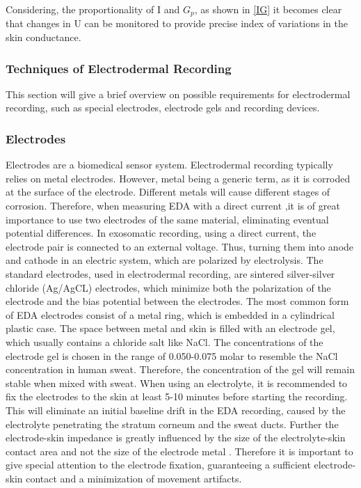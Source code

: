 Considering, the proportionality of I and $G_{p}$, as shown in \ref{IG} it becomes clear that changes in U can be monitored to provide precise index of variations in the skin conductance.\\

\subsubsection{Techniques of Electrodermal Recording}

This section will give a brief overview on possible requirements for electrodermal recording, such as special electrodes, electrode gels and recording devices.

\subsubsection*{Electrodes}
Electrodes are a biomedical sensor system. Electrodermal recording typically relies on metal electrodes. However, metal being a generic term, as it is corroded at the surface of the electrode. Different metals will cause different stages of corrosion. Therefore, when measuring EDA with a direct current ,it is of great importance to use two electrodes of the same material, eliminating eventual potential differences. In exosomatic recording, using a direct current, the electrode pair is connected to an external voltage. Thus, turning them into anode and cathode in an electric system, which are polarized by electrolysis.
The standard electrodes, used in electrodermal recording, are sintered silver-silver chloride (Ag/AgCL) electrodes, which minimize both the polarization of the electrode and the bias potential between the electrodes. The most common form of EDA electrodes consist of a metal ring, which is embedded in a cylindrical plastic case. The space between metal and skin is filled with an electrode gel, which usually contains a chloride salt like NaCl. The concentrations of the electrode gel is chosen in the range of 0.050-0.075 molar to resemble the NaCl concentration in human sweat. Therefore, the concentration of the gel will remain stable when mixed with sweat. When using an electrolyte, it is recommended to fix the electrodes to the skin at least 5-10 minutes before starting the recording. This will eliminate an initial  baseline drift in the EDA recording, caused by the electrolyte penetrating the stratum corneum and the sweat ducts. Further the electrode-skin impedance is greatly influenced by the size of the electrolyte-skin contact area and not the size of the electrode metal \citep{boucsein2012electrodermal}. Therefore it is important to give special attention to the electrode fixation, guaranteeing a sufficient electrode-skin contact and a minimization of movement artifacts.

